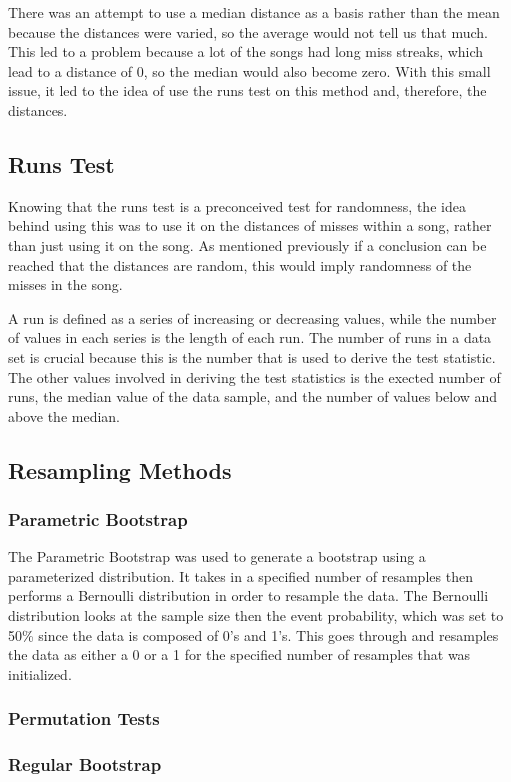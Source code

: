 \documentclass[12pt, letterpaper]{article}
\begin{document}
There was an attempt to use a median distance as a basis rather than the mean because the distances were varied, so the average would not tell us that much.  This led to a problem because a lot of the songs had long miss streaks, which lead to a distance of 0, so the median would also become zero.  With this small issue, it led to the idea of use the runs test on this method and, therefore, the distances.  

\subsection{Runs Test}
Knowing that the runs test is a preconceived test for randomness, the idea behind using this was to use it on the distances of misses within a song, rather than just using it on the song. As mentioned previously if a conclusion can be reached that the distances are random, this would imply randomness of the misses in the song. 

A run is defined as a series of increasing or decreasing values, while the number of values in each series is the length of each run. The number of runs in a data set is crucial because this is the number that is used to derive the test statistic. The other values involved in deriving the test statistics is the exected number of runs, the median value of the data sample, and the number of values below and above the median.

\subsection{Resampling Methods}
\subsubsection{Parametric Bootstrap}
The Parametric Bootstrap was used to generate a bootstrap using a parameterized distribution.  It takes in a specified number of resamples then performs a Bernoulli distribution in order to resample the data.  The Bernoulli distribution looks at the sample size then the event probability, which was set to 50\% since the data is composed of 0's and 1's.  This goes through and resamples the data as either a 0 or a 1 for the specified number of resamples that was initialized.   

\subsubsection{Permutation Tests}
\subsubsection{Regular Bootstrap}
\end{document}
